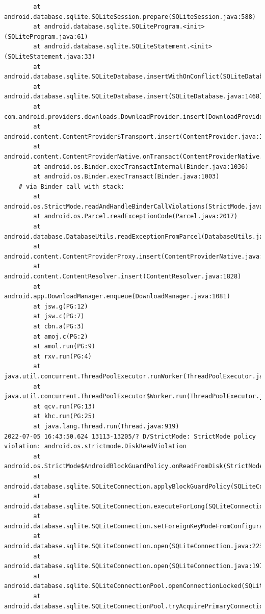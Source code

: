 \documentclass[a4paper,12pt]{book}
\begin{document}
\begin{lstlisting}
        at android.database.sqlite.SQLiteSession.prepare(SQLiteSession.java:588)
        at android.database.sqlite.SQLiteProgram.<init>(SQLiteProgram.java:61)
        at android.database.sqlite.SQLiteStatement.<init>(SQLiteStatement.java:33)
        at android.database.sqlite.SQLiteDatabase.insertWithOnConflict(SQLiteDatabase.java:1597)
        at android.database.sqlite.SQLiteDatabase.insert(SQLiteDatabase.java:1468)
        at com.android.providers.downloads.DownloadProvider.insert(DownloadProvider.java:972)
        at android.content.ContentProvider$Transport.insert(ContentProvider.java:309)
        at android.content.ContentProviderNative.onTransact(ContentProviderNative.java:154)
        at android.os.Binder.execTransactInternal(Binder.java:1036)
        at android.os.Binder.execTransact(Binder.java:1003)
    # via Binder call with stack:
        at android.os.StrictMode.readAndHandleBinderCallViolations(StrictMode.java:2289)
        at android.os.Parcel.readExceptionCode(Parcel.java:2017)
        at android.database.DatabaseUtils.readExceptionFromParcel(DatabaseUtils.java:137)
        at android.content.ContentProviderProxy.insert(ContentProviderNative.java:481)
        at android.content.ContentResolver.insert(ContentResolver.java:1828)
        at android.app.DownloadManager.enqueue(DownloadManager.java:1081)
        at jsw.g(PG:12)
        at jsw.c(PG:7)
        at cbn.a(PG:3)
        at amoj.c(PG:2)
        at amol.run(PG:9)
        at rxv.run(PG:4)
        at java.util.concurrent.ThreadPoolExecutor.runWorker(ThreadPoolExecutor.java:1167)
        at java.util.concurrent.ThreadPoolExecutor$Worker.run(ThreadPoolExecutor.java:641)
        at qcv.run(PG:13)
        at khc.run(PG:25)
        at java.lang.Thread.run(Thread.java:919)
2022-07-05 16:43:50.624 13113-13205/? D/StrictMode: StrictMode policy violation: android.os.strictmode.DiskReadViolation
        at android.os.StrictMode$AndroidBlockGuardPolicy.onReadFromDisk(StrictMode.java:1571)
        at android.database.sqlite.SQLiteConnection.applyBlockGuardPolicy(SQLiteConnection.java:1138)
        at android.database.sqlite.SQLiteConnection.executeForLong(SQLiteConnection.java:688)
        at android.database.sqlite.SQLiteConnection.setForeignKeyModeFromConfiguration(SQLiteConnection.java:290)
        at android.database.sqlite.SQLiteConnection.open(SQLiteConnection.java:223)
        at android.database.sqlite.SQLiteConnection.open(SQLiteConnection.java:197)
        at android.database.sqlite.SQLiteConnectionPool.openConnectionLocked(SQLiteConnectionPool.java:505)
        at android.database.sqlite.SQLiteConnectionPool.tryAcquirePrimaryConnectionLocked(SQLiteConnectionPool.java:949)

\end{lstlisting}
\end{document}
